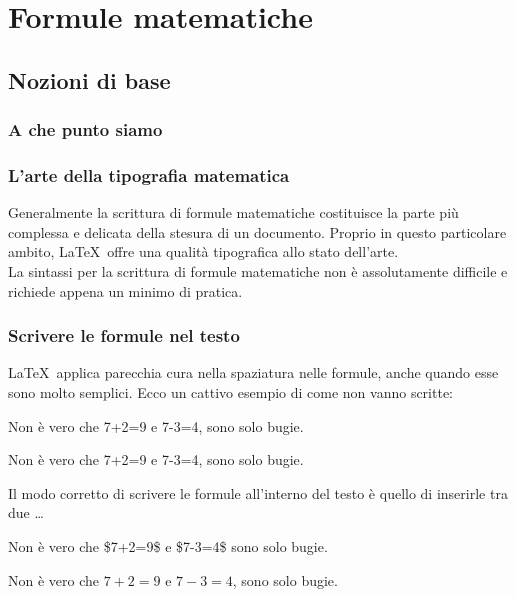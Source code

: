 \documentclass[svgnames,%
	ucs,%
	pdftex]{guitbeamer}
\begin{document}
\section{Formule matematiche}
\subsection{Nozioni di base}
\begin{frame}
  \frametitle{A che punto siamo}
\end{frame}
\begin{frame}
  \frametitle{L'arte della tipografia matematica}
	Generalmente la scrittura di formule matematiche costituisce la parte pi\`u complessa e delicata della stesura di un documento. Proprio in questo particolare ambito, \LaTeX\ offre una qualit\`a tipografica allo stato dell'arte.\\
  \medskip
	La sintassi per la scrittura di formule matematiche non \`e assolutamente difficile e richiede appena un minimo di pratica.
\end{frame}
\begin{frame}
  \frametitle{Scrivere le formule nel testo}
	\LaTeX\ applica parecchia cura nella spaziatura nelle formule, anche quando esse sono molto semplici. Ecco un cattivo esempio di come non vanno scritte:
	\begin{LaTeXcode}
		Non \`e vero che 7+2=9 e 7-3=4, sono solo bugie.
	\end{LaTeXcode}
	\begin{LaTeXoutput}
		Non \`e vero che 7+2=9 e 7-3=4,  sono solo bugie.
	\end{LaTeXoutput}
  \smallskip
	Il modo corretto di scrivere le formule all'interno del testo \`e quello di inserirle tra due \LCmd[]{\textdollar}\dots\LCmd[]{\textdollar}
	\begin{LaTeXcode}
		Non \`e vero che \alert{\$7+2=9\$} e \alert{\$7-3=4\$} sono solo bugie.
	\end{LaTeXcode}
	\begin{LaTeXoutput}
		Non \`e vero che $7+2=9$ e $7-3=4$, sono solo bugie.
	\end{LaTeXoutput}
\end{frame}
\end{document}
